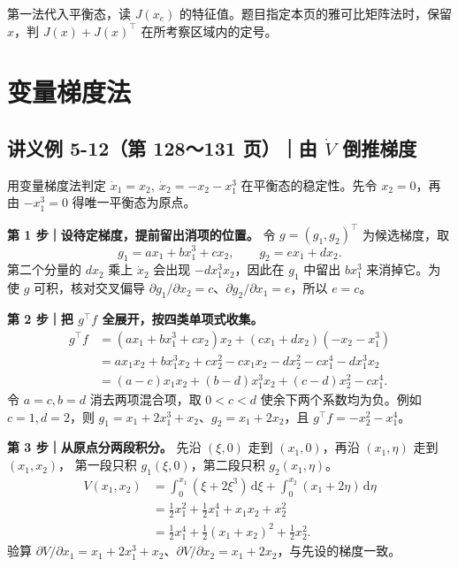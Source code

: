 \documentclass[UTF8,a4paper,11pt,fontset=fandol]{ctexart}
\newcommand{\dd}{\,\mathrm{d}}
\begin{document}
\begin{keybox}
第一法代入平衡态，读 $J(x_e)$ 的特征值。题目指定本页的雅可比矩阵法时，保留 $x$，判 $J(x)+J(x)^\top$ 在所考察区域内的定号。
\end{keybox}

\newpage
\section{变量梯度法}\label{sec:gradient}

\subsection*{讲义例 5-12（第 128～131 页）｜由 $\dot V$ 倒推梯度}
用变量梯度法判定 $\dot x_1=x_2,\ \dot x_2=-x_2-x_1^3$ 在平衡态的稳定性。先令 $x_2=0$，再由 $-x_1^3=0$ 得唯一平衡态为原点。

\textbf{第 1 步｜设待定梯度，提前留出消项的位置。}
令 $g=(g_1,g_2)^\top$ 为候选梯度，取
\[
 g_1=a x_1+b x_1^3+c x_2,\qquad g_2=e x_1+d x_2 .
\]
第二个分量的 $d x_2$ 乘上 $\dot x_2$ 会出现 $-d x_1^3x_2$，因此在 $g_1$ 中留出 $b x_1^3$ 来消掉它。为使 $g$ 可积，核对交叉偏导
$\partial g_1/\partial x_2=c$、$\partial g_2/\partial x_1=e$，所以 $e=c$。

\textbf{第 2 步｜把 $g^\top f$ 全展开，按四类单项式收集。}
\[
\begin{aligned}
 g^\top f
  &=(a x_1+b x_1^3+c x_2)x_2
       +(c x_1+d x_2)(-x_2-x_1^3)\\
  &=a x_1x_2+b x_1^3x_2+c x_2^2
       -c x_1x_2-d x_2^2-c x_1^4-d x_1^3x_2\\
  &=(a-c)x_1x_2+(b-d)x_1^3x_2+(c-d)x_2^2-c x_1^4 .
\end{aligned}
\]
令 $a=c,b=d$ 消去两项混合项，取 $0<c<d$ 使余下两个系数均为负。例如 $c=1,d=2$，则
$g_1=x_1+2x_1^3+x_2$、$g_2=x_1+2x_2$，且 $g^\top f=-x_2^2-x_1^4$。

\textbf{第 3 步｜从原点分两段积分。}
先沿 $(\xi,0)$ 走到 $(x_1,0)$，再沿 $(x_1,\eta)$ 走到 $(x_1,x_2)$，
第一段只积 $g_1(\xi,0)$，第二段只积 $g_2(x_1,\eta)$。
\[
\begin{aligned}
 V(x_1,x_2)
 &=\int_0^{x_1}(\xi+2\xi^3)\dd\xi+\int_0^{x_2}(x_1+2\eta)\dd\eta\\
 &=\tfrac12x_1^2+\tfrac12x_1^4+x_1x_2+x_2^2\\
 &=\tfrac12x_1^4+\tfrac12(x_1+x_2)^2+\tfrac12x_2^2 .
\end{aligned}
\]
验算 $\partial V/\partial x_1=x_1+2x_1^3+x_2$、$\partial V/\partial x_2=x_1+2x_2$，与先设的梯度一致。
\end{document}

